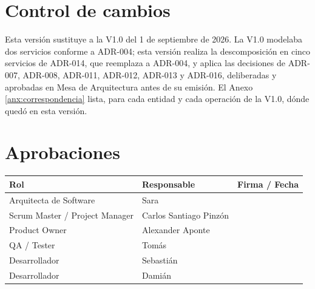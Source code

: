 \documentclass[11pt,a4paper]{article}
\begin{document}
\section*{Control de cambios}

\noindent Esta versión sustituye a la V1.0 del 1 de septiembre de 2026. La V1.0 modelaba dos servicios conforme a ADR-004; esta versión realiza la descomposición en cinco servicios de ADR-014, que reemplaza a ADR-004, y aplica las decisiones de ADR-007, ADR-008, ADR-011, ADR-012, ADR-013 y ADR-016, deliberadas y aprobadas en Mesa de Arquitectura antes de su emisión. El Anexo \ref{anx:correspondencia} lista, para cada entidad y cada operación de la V1.0, dónde quedó en esta versión.

\vspace{0.4cm}

\section*{Aprobaciones}

\begin{longtable}{L{4.6cm} L{4.4cm} L{4.6cm}}
\toprule
\textbf{Rol} & \textbf{Responsable} & \textbf{Firma / Fecha} \\
\midrule
\endhead
\bottomrule
\endlastfoot
Arquitecta de Software & Sara & \\
Scrum Master / Project Manager & Carlos Santiago Pinzón & \\
Product Owner & Alexander Aponte & \\
QA / Tester & Tomás & \\
Desarrollador & Sebastián & \\
Desarrollador & Damián & \\
\end{longtable}

\vspace{0.2cm}
\end{document}
